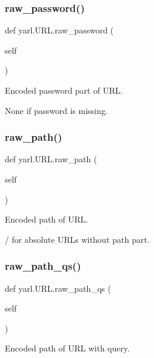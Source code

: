 \subsubsection{\texorpdfstring{raw\+\_\+password()}{raw\_password()}}
{\footnotesize\ttfamily def yarl.\+U\+R\+L.\+raw\+\_\+password (\begin{DoxyParamCaption}\item[{}]{self }\end{DoxyParamCaption})}

\begin{DoxyVerb}Encoded password part of URL.

None if password is missing.\end{DoxyVerb}
 \mbox{\label{classyarl_1_1_u_r_l_aeb54b14de2c6e6ace3455602e92ea1f3}} 
\subsubsection{\texorpdfstring{raw\+\_\+path()}{raw\_path()}}
{\footnotesize\ttfamily def yarl.\+U\+R\+L.\+raw\+\_\+path (\begin{DoxyParamCaption}\item[{}]{self }\end{DoxyParamCaption})}

\begin{DoxyVerb}Encoded path of URL.

/ for absolute URLs without path part.\end{DoxyVerb}
 \mbox{\label{classyarl_1_1_u_r_l_a70320d1f58f06dc5f01bc96a21544ea4}} 
\subsubsection{\texorpdfstring{raw\+\_\+path\+\_\+qs()}{raw\_path\_qs()}}
{\footnotesize\ttfamily def yarl.\+U\+R\+L.\+raw\+\_\+path\+\_\+qs (\begin{DoxyParamCaption}\item[{}]{self }\end{DoxyParamCaption})}

\begin{DoxyVerb}Encoded path of URL with query.\end{DoxyVerb}
 \mbox{\label{classyarl_1_1_u_r_l_a5b3ce1d94b6a97d7b7c10206e4a2e5bb}} 
